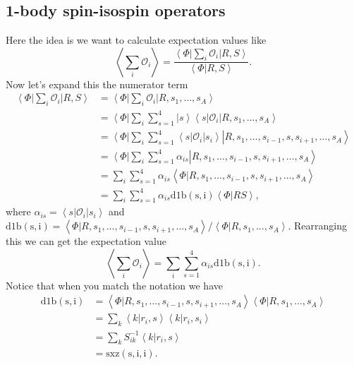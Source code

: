 \documentclass[12pt]{extarticle}
\newcommand{\Oi}{\mathcal{O}_{i}}
\newcommand{\ket}[1]{\left| #1 \right>}
\newcommand{\bra}[1]{\left< #1 \right|}
\newcommand{\braket}[2]{\left< #1 | #2 \right>}
\newcommand{\ketbra}[2]{\left| #1 \right> \left< #2 \right|}
\newcommand{\mycolor}[1]{\textit{\textcolor{red}{#1}}}
\newcommand{\longsi}{s_1, \ldots, s_{i-1} , s, s_{i+1}, \ldots, s_A}
\begin{document}
\subsection{1-body spin-isospin operators}
Here the idea is we want to calculate expectation values like
\begin{equation}
 \left< \sum_i \Oi \right> = \frac{\bra{\Phi} \sum\limits_i \Oi \ket{R,S}}{\braket{\Phi}{R,S}}.
\end{equation}
Now let's expand this the numerator term
\begin{align}
  \bra{\Phi} \sum_i \Oi \ket{R,S} &= \bra{\Phi} \sum_i \Oi \ket{R,s_1,\ldots,s_A} \\
  &= \bra{\Phi} \sum_i\sum_{s=1}^4  \ketbra{s}{s} \Oi \ket{R,s_1,\ldots,s_A} \\
  &= \bra{\Phi} \sum_i\sum_{s=1}^4  \bra{s}\Oi\ket{s_i} \ket{R,\longsi} \\
  &= \bra{\Phi} \sum_i\sum_{s=1}^4 \alpha_{is} \ket{R,\longsi} \\
  &= \sum_i\sum_{s=1}^4 \alpha_{is} \braket{\Phi}{R,\longsi} \\
  &= \sum_i\sum_{s=1}^4 \alpha_{is} \mathrm{d1b(s,i)} \braket{\Phi}{RS},
\end{align}
where $\alpha_{is} = \bra{s} \Oi \ket{s_i}$ and $\mathrm{d1b(s,i)} = \braket{\Phi}{R,\longsi}/\braket{\Phi}{R,s_1,\ldots,s_A}$. Rearranging this we can get the expectation value
\begin{equation}
  \left< \sum_i \Oi \right> = \sum_i \sum_{s=1}^4 \alpha_{is}\mathrm{d1b(s,i)}.
\end{equation}
Notice that when you match the notation we have
\begin{align}
  \mathrm{d1b(s,i)} &= \braket{\Phi}{R,\longsi} \braket{\Phi}{R,s_1,\ldots,s_A} \\
  &= \sum_k \braket{k}{r_i,s} \braket{k}{r_i,s_i} \\
  &= \sum_k S^{-1}_{ik} \braket{k}{r_i,s} \\
  &= \mathrm{sxz(s,i,i)}.
\end{align}
\end{document}
